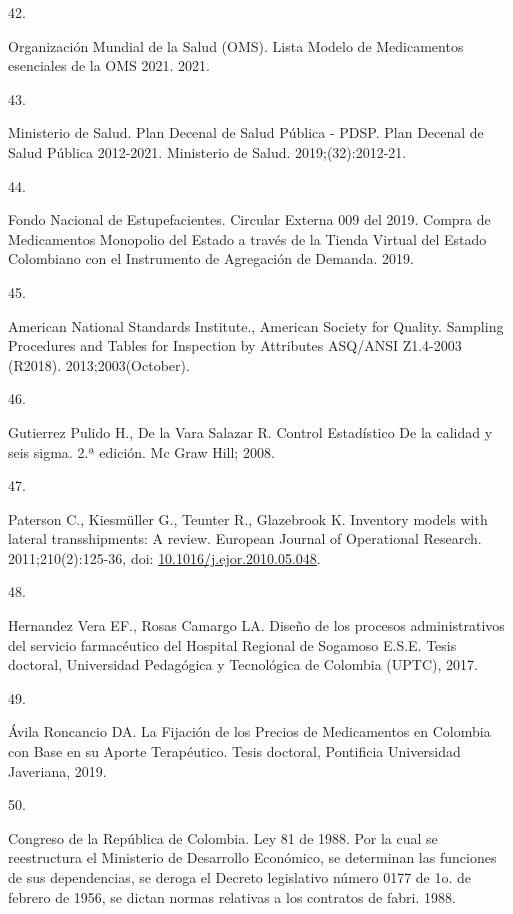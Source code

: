 \documentclass[
]{book}
\newlength{\cslhangindent}
\newlength{\csllabelwidth}
\newlength{\cslentryspacingunit} %
\newenvironment{CSLReferences}[2] %
 {%
  \setlength{\parindent}{0pt}
  \ifodd #1
  \let\oldpar\par
  \def\par{\hangindent=\cslhangindent\oldpar}
  \fi
  \setlength{\parskip}{#2\cslentryspacingunit}
 }%
 {}
\newcommand{\CSLLeftMargin}[1]{\parbox[t]{\csllabelwidth}{#1}}
\newcommand{\CSLRightInline}[1]{\parbox[t]{\linewidth - \csllabelwidth}{#1}\break}
\begin{document}
\begin{CSLReferences}{0}{0}
\leavevmode{}%
\CSLLeftMargin{42. }
\CSLRightInline{Organización Mundial de la Salud (OMS). {Lista Modelo de Medicamentos esenciales de la OMS 2021}. 2021.}

\leavevmode{}%
\CSLLeftMargin{43. }
\CSLRightInline{Ministerio de Salud. {Plan Decenal de Salud P{ú}blica - PDSP. Plan Decenal de Salud P{ú}blica 2012-2021}. Ministerio de Salud. 2019;(32):2012-21.}

\leavevmode{}%
\CSLLeftMargin{44. }
\CSLRightInline{Fondo Nacional de Estupefacientes. {Circular Externa 009 del 2019. Compra de Medicamentos Monopolio del Estado a trav{é}s de la Tienda Virtual del Estado Colombiano con el Instrumento de Agregaci{ó}n de Demanda}. 2019.}

\leavevmode{}%
\CSLLeftMargin{45. }
\CSLRightInline{American National Standards Institute., American Society for Quality. {Sampling Procedures and Tables for Inspection by Attributes ASQ/ANSI Z1.4-2003 (R2018)}. 2013;2003(October).}

\leavevmode{}%
\CSLLeftMargin{46. }
\CSLRightInline{Gutierrez Pulido H., De la Vara Salazar R. {Control Estad{í}stico De la calidad y seis sigma}. 2.ª edición. Mc Graw Hill; 2008.}

\leavevmode{}%
\CSLLeftMargin{47. }
\CSLRightInline{Paterson C., Kiesmüller G., Teunter R., Glazebrook K. {Inventory models with lateral transshipments: A review}. European Journal of Operational Research. 2011;210(2):125-36, doi: \href{https://doi.org/10.1016/j.ejor.2010.05.048}{10.1016/j.ejor.2010.05.048}.}

\leavevmode{}%
\CSLLeftMargin{48. }
\CSLRightInline{Hernandez Vera EF., Rosas Camargo LA. {Dise{ñ}o de los procesos administrativos del servicio farmac{é}utico del Hospital Regional de Sogamoso E.S.E.} Tesis doctoral, Universidad Pedag{ó}gica y Tecnol{ó}gica de Colombia (UPTC), 2017.}

\leavevmode{}%
\CSLLeftMargin{49. }
\CSLRightInline{Ávila Roncancio DA. {La Fijaci{ó}n de los Precios de Medicamentos en Colombia con Base en su Aporte Terap{é}utico}. Tesis doctoral, Pontificia Universidad Javeriana, 2019.}

\leavevmode{}%
\CSLLeftMargin{50. }
\CSLRightInline{Congreso de la República de Colombia. {Ley 81 de 1988. Por la cual se reestructura el Ministerio de Desarrollo Econ{ó}mico, se determinan las funciones de sus dependencias, se deroga el Decreto legislativo n{ú}mero 0177 de 1o. de febrero de 1956, se dictan normas relativas a los contratos de fabri}. 1988.}


\end{CSLReferences}
\end{document}
